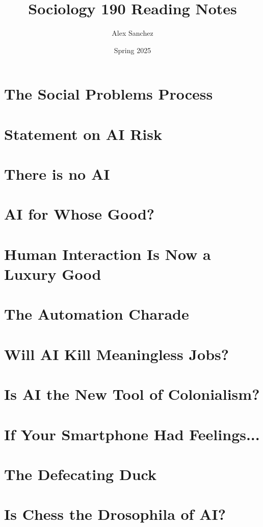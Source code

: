 \documentclass[openany]{book}
\title{Sociology 190 Reading Notes}
\author{Alex Sanchez}
\date{Spring 2025}
\begin{document}
\maketitle

\chapter{The Social Problems Process}

\chapter{Statement on AI Risk}

\chapter{There is no AI}

\chapter{AI for Whose Good?}


\chapter{Human Interaction Is Now a Luxury Good}


\chapter{The Automation Charade}



\chapter{Will AI Kill Meaningless Jobs?}



\chapter{Is AI the New Tool of Colonialism?}


\chapter{If Your Smartphone Had Feelings...}


\chapter{The Defecating Duck}


\chapter{Is Chess the Drosophila of AI?}

\end{document}
